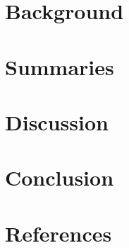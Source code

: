 \documentclass[acmsmall,screen,authorversion]{acmart}
\begin{document}
\section{Background}


\section{Summaries}


\section{Discussion}


\section{Conclusion}


\section{References}


\end{document}
